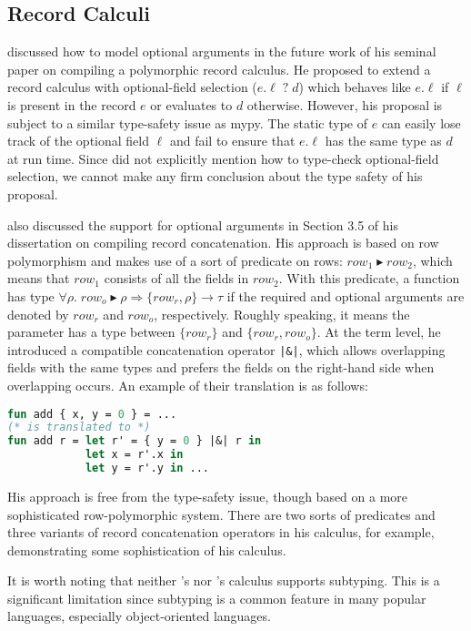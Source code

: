 \subsection{Record Calculi}

\citet{ohori1995polymorphic} discussed how to model optional arguments in the
future work of his seminal paper on compiling a polymorphic record calculus. He
proposed to extend a record calculus with optional-field selection
($e.\ell\;?\;d$) which behaves like $e.\ell$ if $\ell$ is present in the record
$e$ or evaluates to $d$ otherwise. However, his proposal is subject to a similar
type-safety issue as mypy. The static type of $e$ can easily lose track of the
optional field $\ell$ and fail to ensure that $e.\ell$ has the same type as $d$
at run time. Since \citeauthor{ohori1995polymorphic} did not explicitly mention
how to type-check optional-field selection, we cannot make any firm conclusion
about the type safety of his proposal.

\citet{osinski2006polymorphic} also discussed the support for optional arguments
in Section 3.5 of his dissertation on compiling record concatenation. His
approach is based on row polymorphism and makes use of a sort of predicate on
rows: $\mathit{row}_1\blacktriangleright\mathit{row}_2$, which means that
$\mathit{row}_1$ consists of all the fields in $\mathit{row}_2$. With this
predicate, a function has type
$\forall\rho.\;\mathit{row}_o\blacktriangleright\rho\Rightarrow\{\mathit{row}_r,\rho\}\to\tau$
if the required and optional arguments are denoted by $\mathit{row}_r$ and
$\mathit{row}_o$, respectively. Roughly speaking, it means the parameter has a
type between $\{\mathit{row}_r\}$ and $\{\mathit{row}_r,\mathit{row}_o\}$. At
the term level, he introduced a compatible concatenation operator
\lstinline{|&|}, which allows overlapping fields with the same types and prefers
the fields on the right-hand side when overlapping occurs. An example of their
translation is as follows:
\begin{lstlisting}[language=Caml]
fun add { x, y = 0 } = ...
(* is translated to *)
fun add r = let r' = { y = 0 } |&| r in
            let x = r'.x in
            let y = r'.y in ...
\end{lstlisting}
His approach is free from the type-safety issue, though based on a more
sophisticated row-polymorphic system. There are two sorts of predicates and
three variants of record concatenation operators in his calculus, for example,
demonstrating some sophistication of his calculus.

It is worth noting that neither \citeauthor{ohori1995polymorphic}'s nor
\citeauthor{osinski2006polymorphic}'s calculus supports subtyping. This is a
significant limitation since subtyping is a common feature in many popular
languages, especially object-oriented languages.

